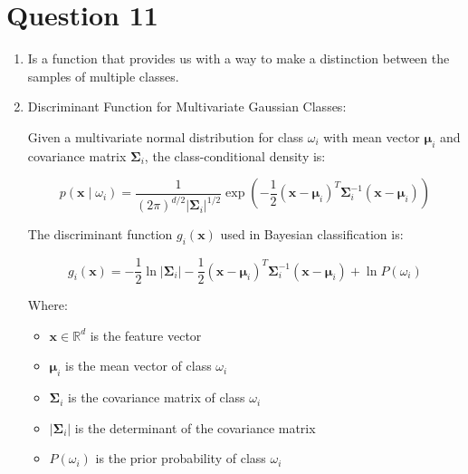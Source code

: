 \documentclass[a4paper,12pt]{article}
\begin{document}
\section*{Question 11}
\begin{enumerate}[label=(\alph*)]
    \item Is a function that provides us with a way to make a distinction between the samples of multiple classes.
    \item Discriminant Function for Multivariate Gaussian Classes:
    
    Given a multivariate normal distribution for class \( \omega_i \) with mean vector \( \boldsymbol{\mu}_i \) and covariance matrix \( \boldsymbol{\Sigma}_i \), the class-conditional density is:

    \[
    p(\boldsymbol{x} \mid \omega_i) = \frac{1}{(2\pi)^{d/2} |\boldsymbol{\Sigma}_i|^{1/2}} \exp\left( -\frac{1}{2} (\boldsymbol{x} - \boldsymbol{\mu}_i)^T \boldsymbol{\Sigma}_i^{-1} (\boldsymbol{x} - \boldsymbol{\mu}_i) \right)
    \]

    The discriminant function \( g_i(\boldsymbol{x}) \) used in Bayesian classification is:

    \[
    g_i(\boldsymbol{x}) = -\frac{1}{2} \ln |\boldsymbol{\Sigma}_i|
    - \frac{1}{2} (\boldsymbol{x} - \boldsymbol{\mu}_i)^T \boldsymbol{\Sigma}_i^{-1} (\boldsymbol{x} - \boldsymbol{\mu}_i)
    + \ln P(\omega_i)
    \]

    \noindent
    Where:
    \begin{itemize}
        \item \( \boldsymbol{x} \in \mathbb{R}^d \) is the feature vector
        \item \( \boldsymbol{\mu}_i \) is the mean vector of class \( \omega_i \)
        \item \( \boldsymbol{\Sigma}_i \) is the covariance matrix of class \( \omega_i \)
        \item \( |\boldsymbol{\Sigma}_i| \) is the determinant of the covariance matrix
        \item \( P(\omega_i) \) is the prior probability of class \( \omega_i \)
    \end{itemize}
\end{enumerate}
\end{document}
